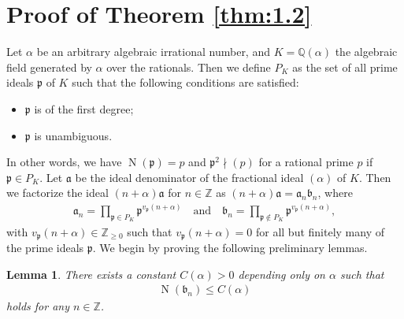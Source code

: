 \documentclass[a4paper,11pt]{amsart}
\newtheorem{lemma}[theorem]{Lemma}
\theoremstyle{definition}
\numberwithin{equation}{section}
\DeclareMathOperator{\norm}{N}
\begin{document}
\section{Proof of Theorem \ref{thm:1.2}}\label{sec:5}
Let $\alpha$ be an arbitrary algebraic irrational number, and $K=\mathbb{Q}(\alpha)$ the algebraic field generated by $\alpha$ over the rationals. 
Then we define $P_K$ as the set of all prime ideals $\mathfrak{p}$ of $K$ such that the following conditions are satisfied: 
\begin{itemize}
\item[$(\mathrm{i})$]
$\mathfrak{p}$ is of the first degree; 
\item[$(\mathrm{ii})$]
$\mathfrak{p}$ is unambiguous. 
\end{itemize}
In other words, we have $\norm(\mathfrak{p})=p$ and $\mathfrak{p}^2 \nmid (p)$ for a rational prime $p$ if $\mathfrak{p} \in P_K$. 
Let $\mathfrak{a}$ be the ideal denominator of the fractional ideal $(\alpha)$ of $K$. 
Then we factorize the ideal $(n+\alpha)\mathfrak{a}$ for $n \in \mathbb{Z}$ as $(n+\alpha)\mathfrak{a}= \mathfrak{a}_n \mathfrak{b}_n$, where
\begin{align*}
\mathfrak{a}_n
= \prod_{\mathfrak{p} \in P_K} \mathfrak{p}^{v_{\mathfrak{p}}(n+\alpha)}
\quad\text{and}\quad
\mathfrak{b}_n
= \prod_{\mathfrak{p} \notin P_K} \mathfrak{p}^{v_{\mathfrak{p}}(n+\alpha)}, 
\end{align*}
with $v_{\mathfrak{p}}(n+\alpha) \in \mathbb{Z}_{\geq0}$ such that $v_{\mathfrak{p}}(n+\alpha)=0$ for all but finitely many of the prime ideals $\mathfrak{p}$. 
We begin by proving the following preliminary lemmas. 

\begin{lemma}\label{lem:5.1}
There exists a constant $C(\alpha)>0$ depending only on $\alpha$ such that
\begin{align*}
\norm(\mathfrak{b}_n)
\leq C(\alpha)
\end{align*}
holds for any $n \in \mathbb{Z}$. 
\end{lemma}
\end{document}
